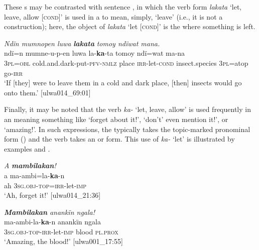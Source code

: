 These  s may be contrasted with sentence , in which the  verb form \textit{lakata} ‘let, leave, allow [\textsc{cond}]’ is used in a  to mean, simply, ‘leave’ (i.e., it is not a  construction); here, the object of \textit{lakata} ‘let [\textsc{cond]}’ is the  where something is left.

\ea%
    \label{ex:syntax:376}
          \textit{Ndïn mumnopen luwa} \textbf{\textit{lakata}} \textit{tomoy ndïwat mana.}\\
\gll    ndï=n    mumne-u-p-en        luwa  la-\textbf{ka}{}-ta tomoy    ndï=wat  ma-na\\
    3\textsc{pl=obl}  cold.and.dark-put-\textsc{pfv-nmlz}  place  \textsc{irr-}let-\textsc{cond}    insect.species  3\textsc{pl=}atop  go-\textsc{irr}\\
\glt `If [they] were to leave them in a cold and dark place, [then] insects would go onto them.’ [ulwa014\_69:01]
\z

Finally, it may be noted that the verb \textit{ka-} ‘let, leave, allow’ is used frequently in an  meaning something like ‘forget about it!’, ‘don’t’ even mention it!’, or ‘amazing!’. In such expressions, the  typically takes the  topic-marked pronominal form () and the verb takes an  or  form. This use of \textit{ka-} ‘let’ is illustrated by examples  and .


\ea%
    \label{ex:syntax:377}
          \textit{A} \textbf{\textit{mambilakan}}\textit{!}\\
\gll    a  ma-ambi=la-\textbf{ka}{}-n\\
    ah  3\textsc{sg.obj-top}=\textsc{irr-}let-\textsc{imp}\\
\glt `Ah, forget it!’ [ulwa014\_21:36]
\z

\ea%
    \label{ex:syntax:378}
          \textbf{\textit{Mambilakan}} \textit{anankïn ngala!}\\
\gll    ma-ambi-la-\textbf{ka}{}-n      anankïn  ngala\\
    3\textsc{sg.obj-top-irr}{}-let-\textsc{imp}  blood    \textsc{pl.prox}\\
\glt `Amazing, the blood!’ [ulwa001\_17:55]
\z

